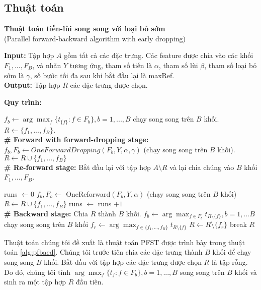 \subsection{Thuật toán}
\begin{breakablealgorithm}
	\caption{\textbf{Thuật toán tiến-lùi song song với loại bỏ sớm}\\
		(Parallel forward-backward algorithm with early dropping)}\label{alg:pfbaed}
	\noindent\textbf{Input:} Tập hợp $A$ gồm tất cả các đặc trưng. Các feature được chia vào các khối $F_1,..., F_B$, và nhãn $Y$ tương ứng, tham số tiến là $\alpha$, tham số lùi $\beta$, tham số loại bỏ sớm là $\gamma$, số bước tối đa sau khi bắt đầu lại là maxRef.\\
	\textbf{Output:} Tập hợp $R$ các đặc trưng được chọn.
	
	\noindent\textbf{Quy trình:}
	\begin{algorithmic}[1]
		\State $f_b \gets \arg\max_f \{t_{\{f\}}: f\in F_b \}, b=1,...,B$ chạy song song trên $B$ khối.
		\State $R \gets \{f_1,...,f_B\}$.\\
		\textbf{\# Forward with forward-dropping stage:}
		\State $f_b,F_b \gets OneForwardDropping(F_b,Y,\alpha,\gamma)$ (chạy song song trên $B$ khối).
		\State $R \gets R\cup \{f_1,..., f_B\}$ 
		\EndWhile\\
		\textbf{\# Re-forward stage:}
		\State Bắt đầu lại với tập hợp $A\setminus R$ và lại chia chúng vào $B$ khối $F_1,..., F_B$.
		
		\State runs $\gets 0$
		\State $f_b,F_b \gets$ OneReforward$(F_b,Y,\alpha)$ (chạy song song trên $B$ khối)
		\State $R \gets R\cup \{f_1,..., f_B\}$
		\State runs $\gets$ runs $+1$
		\EndWhile\\
		\textbf{\# Backward stage:}
		\State Chia $R$ thành $B$ khối.
		\State $f_b \gets \arg \max_{f\in F_b} t_{R\setminus\{f\}}, b=1,...B$ chạy song song trên $B$ khối
		\State $f_r \gets \arg \max_{f\in \{f_1,...,f_B\}} t_{R\setminus \{f\}}$
		\State $R \gets R\setminus \{f_r\}$
		\Else
		\State break
		\EndIf
		\State \Return $R$
	\end{algorithmic}
\end{breakablealgorithm}

Thuật toán chúng tôi đề xuất là thuật toán PFST được trình bày trong thuật toán \ref{alg:pfbaed}. Chúng tôi trước tiên chia các đặc trưng thành $B$ khối để chạy song song $B$ khối. Bắt đầu với tập hợp các đặc trưng được chọn $R$ là tập rỗng. Do đó, chúng tôi tính $\arg\max_{f}\{t_f:f\in F_b\}, b = 1,...,B$ song song trên $B$ khối và sinh ra một tập hợp $R$ đầu tiên.

